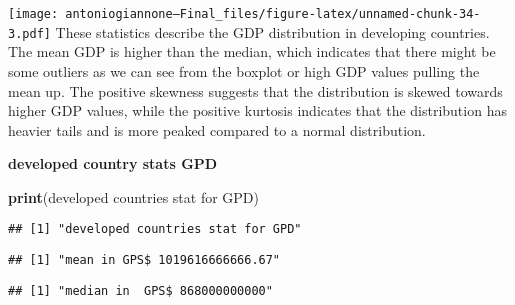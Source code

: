 \documentclass[
]{article}
\newenvironment{Shaded}{\begin{snugshade}}{\end{snugshade}}
\newcommand{\FunctionTok}[1]{\textcolor[rgb]{0.13,0.29,0.53}{\textbf{#1}}}
\newcommand{\NormalTok}[1]{#1}
\newcommand{\SpecialCharTok}[1]{\textcolor[rgb]{0.81,0.36,0.00}{\textbf{#1}}}
\newcommand{\StringTok}[1]{\textcolor[rgb]{0.31,0.60,0.02}{#1}}
\begin{document}
\texttt{[image: antoniogiannone---Final\_files/figure-latex/unnamed-chunk-34-3.pdf]}
These statistics describe the GDP distribution in developing countries.
The mean GDP is higher than the median, which indicates that there might
be some outliers as we can see from the boxplot or high GDP values
pulling the mean up. The positive skewness suggests that the
distribution is skewed towards higher GDP values, while the positive
kurtosis indicates that the distribution has heavier tails and is more
peaked compared to a normal distribution.

\textbf{developed country stats GPD}

\begin{Shaded}
\begin{Highlighting}[]
\FunctionTok{print}\NormalTok{(}\StringTok{\textquotesingle{}developed countries stat for GPD\textquotesingle{}}\NormalTok{)}
\end{Highlighting}
\end{Shaded}

\begin{verbatim}
## [1] "developed countries stat for GPD"
\end{verbatim}

\begin{Shaded}
\end{Shaded}

\begin{verbatim}
## [1] "mean in GPS$ 1019616666666.67"
\end{verbatim}

\begin{Shaded}
\end{Shaded}

\begin{verbatim}
## [1] "median in  GPS$ 868000000000"
\end{verbatim}
\end{document}
